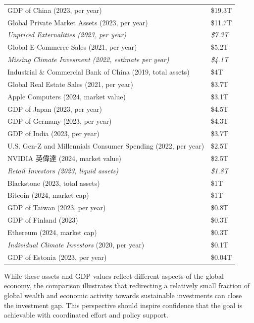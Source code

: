 \documentclass[
  letterpaper,
  DIV=11,
  numbers=noendperiod]{scrartcl}
\begin{document}
\begin{longtable}[]{@{}
  >{\raggedright\arraybackslash}p{}
  >{\raggedright\arraybackslash}p{}@{}}
GDP of China (2023, per year) & \$19.3T \\
Global Private Market Assets (2023, per year) & \$11.7T \\
\emph{Unpriced Externalities (2023, per year)} & \emph{\$7.3T} \\
Global E-Commerce Sales (2021, per year) & \$5.2T \\
\emph{Missing Climate Invesment (2022, estimate per year)} &
\emph{\$4.1T} \\
Industrial \& Commercial Bank of China (2019, total assets) & \$4T \\
Global Real Estate Sales (2021, per year) & \$3.7T \\
Apple Computers (2024, market value) & \$3.1T \\
GDP of Japan (2023, per year) & \$4.5T \\
GDP of Germany (2023, per year) & \$4.3T \\
GDP of India (2023, per year) & \$3.7T \\
U.S. Gen-Z and Millennials Consumer Spending (2022, per year) &
\$2.5T \\
NVIDIA 英偉達 (2024, market value) & \$2.5T \\
\emph{Retail Investors (2023, liquid assets)} & \emph{\$1.8T} \\
Blackstone (2023, total assets) & \$1T \\
Bitcoin (2024, market cap) & \$1T \\
GDP of Taiwan (2023, per year) & \$0.8T \\
GDP of Finland (2023) & \$0.3T \\
Ethereum (2024, market cap) & \$0.3T \\
\emph{Individual Climate Investors} (2020, per year) & \$0.1T \\
GDP of Estonia (2023, per year) & \$0.04T \\
\end{longtable}

While these assets and GDP values reflect different aspects of the
global economy, the comparison illustrates that redirecting a relatively
small fraction of global wealth and economic activity towards
sustainable investments can close the investment gap. This perspective
should inspire confidence that the goal is achievable with coordinated
effort and policy support.
\end{document}
